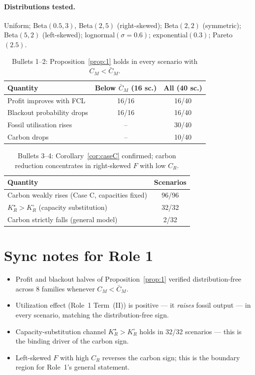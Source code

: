 \documentclass[11pt]{article}
\theoremstyle{definition}
\begin{document}
\paragraph{Distributions tested.}
Uniform; Beta$(0.5,3)$, Beta$(2,5)$ (right-skewed); Beta$(2,2)$ (symmetric); Beta$(5,2)$ (left-skewed); lognormal$(\sigma{=}0.6)$; exponential$(0.3)$; Pareto$(2.5)$.

\begin{table}[h]\centering
\begin{tabular}{lcc}
\toprule
Quantity & Below $\bar C_M$ (16 sc.) & All (40 sc.) \\
\midrule
Profit improves with FCL          & 16/16 & 16/40 \\
Blackout probability drops        & 16/16 & 16/40 \\
Fossil utilisation rises          & --    & 30/40 \\
Carbon drops                      & --    & 10/40 \\
\bottomrule
\end{tabular}
\caption{Bullets 1--2: Proposition~\ref{prop:1} holds in every scenario with $C_M<\bar C_M$.}
\end{table}

\begin{table}[h]\centering
\begin{tabular}{lc}
\toprule
Quantity & Scenarios \\
\midrule
Carbon weakly rises (Case C, capacities fixed)    & 96/96 \\
$K_R^{\star}>K_R^{\circ}$ (capacity substitution)  & 32/32 \\
Carbon strictly falls (general model)             & 2/32 \\
\bottomrule
\end{tabular}
\caption{Bullets 3--4: Corollary~\ref{cor:caseC} confirmed; carbon reduction concentrates in right-skewed $F$ with low $C_R$.}
\end{table}

\section{Sync notes for Role 1}
\begin{itemize}
\item Profit and blackout halves of Proposition~\ref{prop:1} verified distribution-free across 8 families whenever $C_M<\bar C_M$.
\item Utilization effect (Role~1 Term~(II)) is positive --- it \emph{raises} fossil output --- in every scenario, matching the distribution-free sign.
\item Capacity-substitution channel $K_R^{\star}>K_R^{\circ}$ holds in 32/32 scenarios --- this is the binding driver of the carbon sign.
\item Left-skewed $F$ with high $C_R$ reverses the carbon sign; this is the boundary region for Role~1's general statement.
\end{itemize}
\end{document}
